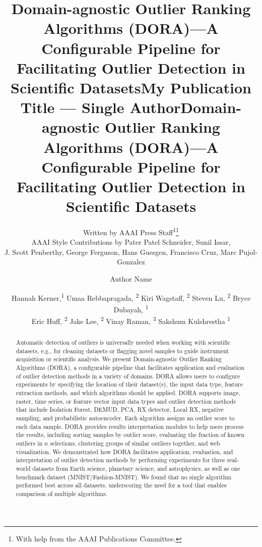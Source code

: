 \documentclass[letterpaper]{article} %
\title{Domain-agnostic Outlier Ranking Algorithms (DORA)---A Configurable Pipeline for Facilitating Outlier Detection in Scientific Datasets}
\author{
    Written by AAAI Press Staff\textsuperscript{\rm 1}\thanks{With help from the AAAI Publications Committee.}\\
    AAAI Style Contributions by Pater Patel Schneider,
    Sunil Issar,  \\
    J. Scott Penberthy,
    George Ferguson,
    Hans Guesgen,
    Francisco Cruz,
    Marc Pujol-Gonzalez
    \\
}
\title{My Publication Title --- Single Author}
\author {
    Author Name \\
}
\title{Domain-agnostic Outlier Ranking Algorithms (DORA)---A Configurable Pipeline for Facilitating Outlier Detection in Scientific Datasets}
\author {
    Hannah Kerner,\textsuperscript{\rm 1}
    Umaa Rebbapragada, \textsuperscript{\rm 2}
    Kiri Wagstaff, \textsuperscript{\rm 2} 
    Steven Lu, \textsuperscript{\rm 2} 
    Bryce Dubayah, \textsuperscript{\rm 1} \\
    Eric Huff, \textsuperscript{\rm 2} 
    Jake Lee, \textsuperscript{\rm 2} 
    Vinay Raman, \textsuperscript{\rm 3}
    Sakshum Kulshrestha \textsuperscript{\rm 1}  \\
}
\begin{document}
\maketitle

\begin{abstract}
Automatic detection of outliers is
universally needed when working with scientific datasets, e.g., for cleaning 
datasets or flagging novel samples to guide instrument acquisition or
 scientific analysis.
We present Domain-agnostic Outlier Ranking Algorithms (DORA),
a configurable pipeline that facilitates application and evaluation of
outlier detection methods in a variety of domains. DORA allows users to 
configure experiments by specifying the location of their 
dataset(s), the input data type, feature extraction methods, and which 
algorithms should be applied. DORA supports image, raster, time series, 
or feature vector input data types and outlier detection methods that include
 Isolation Forest, DEMUD, PCA, RX detector, 
 Local RX, negative sampling, and probabilistic autoencoder. Each algorithm assigns an outlier score to each data sample. DORA
   provides results interpretation modules to help users 
   process the results, including sorting samples by outlier score, evaluating 
   the fraction of known outliers in $n$ selections, clustering groups of 
   similar outliers together, and web visualization. We demonstrated how DORA
   facilitates application, evaluation, and interpretation of outlier detection
   methods by performing
    experiments for three real-world datasets from Earth science, planetary
  science, and astrophysics, as well as one benchmark dataset 
  (MNIST/Fashion-MNIST). We found that no single algorithm
      performed best across all datasets, underscoring the need for a tool 
      that enables comparison of multiple algorithms.
\end{abstract}
\end{document}
